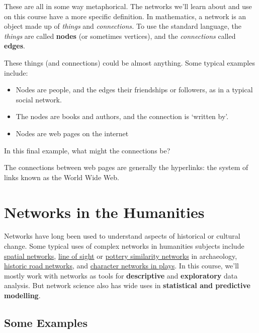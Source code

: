 \documentclass[
]{book}
\begin{document}
These are all in some way metaphorical. The networks we'll learn about and use on this course have a more specific definition. In mathematics, a network is an object made up of \emph{things} and \emph{connections.} To use the standard language, the \emph{things} are called \textbf{nodes} (or sometimes vertices), and the \emph{connections} called \textbf{edges}.

These things (and connections) could be almost anything. Some typical examples include:

\begin{itemize}
\item
  Nodes are people, and the edges their friendships or followers, as in a typical social network.
\item
  The nodes are books and authors, and the connection is `written by'.
\item
  Nodes are web pages on the internet
\end{itemize}

In this final example, what might the connections be?

The connections between web pages are generally the hyperlinks: the system of links known as the World Wide Web.

\hypertarget{networks-in-the-humanities}{%
\section{Networks in the Humanities}\label{networks-in-the-humanities}}

Networks have long been used to understand aspects of historical or cultural change. Some typical uses of complex networks in humanities subjects include \href{https://model-articles.rrchnm.org/articles/midura/}{spatial networks}, \href{https://www.frontiersin.org/articles/10.3389/fdigh.2017.00017/full}{line of sight} or \href{https://academic.oup.com/book/40384/chapter-abstract/347130019?redirectedFrom=fulltext}{pottery similarity networks} in archaeology, \href{https://www.landesgeschichte.uni-goettingen.de/handelsstrassen/index.php}{historic road networks}, and \href{http://www.martingrandjean.ch/network-visualization-shakespeare/}{character networks in plays}. In this course, we'll mostly work with networks as tools for \textbf{descriptive} and \textbf{exploratory} data analysis. But network science also has wide uses in \textbf{statistical and predictive modelling}.

\hypertarget{some-examples}{%
\subsection{Some Examples}\label{some-examples}}
\end{document}
